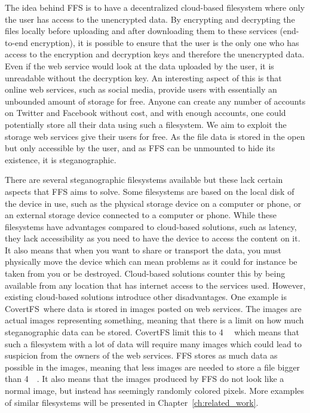 The idea behind \gls{FFS} is to have a decentralized \mbox{cloud-based} filesystem where only the user has access to the unencrypted data. By encrypting and decrypting the files locally before uploading and after downloading them to these services (end-to-end encryption), it is possible to ensure that the user is the only one who has access to the encryption and decryption keys and therefore the unencrypted data. Even if the web service would look at the data uploaded by the user, it is unreadable without the decryption key. An interesting aspect of this is that online web services, such as social media, provide users with essentially an unbounded amount of storage for free. Anyone can create any number of accounts on Twitter and Facebook without cost, and with enough accounts, one could potentially store all their data using such a filesystem. We aim to exploit the storage web services give their users for free. As the file data is stored in the open but only accessible by the user, and as \gls{FFS} can be unmounted to hide its existence, it is steganographic. 

There are several steganographic filesystems available but these lack certain aspects that \gls{FFS} aims to solve. Some filesystems are based on the local disk of the device in use, such as the physical storage device on a computer or phone, or an external storage device connected to a computer or phone. While these filesystems have advantages compared to \mbox{cloud-based} solutions, such as latency, they lack accessibility as you need to have the device to access the content on it. It also means that when you want to share or transport the data, you must physically move the device which can mean problems as it could for instance be taken from you or be destroyed. \mbox{Cloud-based} solutions counter this by being available from any location that has internet access to the services used. However, existing \mbox{cloud-based} solutions introduce other disadvantages. One example is CovertFS\,\cite{baliga2007web} where data is stored in images posted on web services. The images are actual images representing something, meaning that there is a limit on how much steganographic data can be stored. CovertFS limit this to \SI{4}{\kilo\byte} which means that such a filesystem with a lot of data will require many images which could lead to suspicion from the owners of the web services. \gls{FFS} stores as much data as possible in the images, meaning that less images are needed to store a file bigger than \SI{4}{\kilo\byte}. It also means that the images produced by \gls{FFS} do not look like a normal image, but instead has seemingly randomly colored pixels. More examples of similar filesystems will be presented in Chapter~\ref{ch:related_work}. 